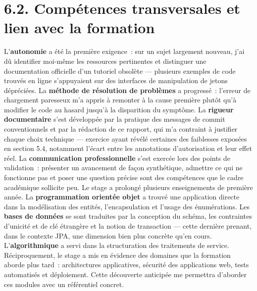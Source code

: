 \documentclass[12pt,a4paper]{report}
\begin{document}
\section*{6.2. Compétences transversales et lien avec la formation}
L'\textbf{autonomie} a été la première exigence~: sur un sujet largement nouveau, j'ai dû identifier moi-même les ressources pertinentes et distinguer une documentation officielle d'un tutoriel obsolète — plusieurs exemples de code trouvés en ligne s'appuyaient sur des interfaces de manipulation de jetons dépréciées. La \textbf{méthode de résolution de problèmes} a progressé~: l'erreur de chargement paresseux m'a appris à remonter à la cause première plutôt qu'à modifier le code au hasard jusqu'à la disparition du symptôme. La \textbf{rigueur documentaire} s'est développée par la pratique des messages de commit conventionnels et par la rédaction de ce rapport, qui m'a contraint à justifier chaque choix technique — exercice ayant révélé certaines des faiblesses exposées en section 5.4, notamment l'écart entre les annotations d'autorisation et leur effet réel. La \textbf{communication professionnelle} s'est exercée lors des points de validation~: présenter un avancement de façon synthétique, admettre ce qui ne fonctionne pas et poser une question précise sont des compétences que le cadre académique sollicite peu.
Le stage a prolongé plusieurs enseignements de première année. La \textbf{programmation orientée objet} a trouvé une application directe dans la modélisation des entités, l'encapsulation et l'usage des énumérations. Les \textbf{bases de données} se sont traduites par la conception du schéma, les contraintes d'unicité et de clé étrangère et la notion de transaction — cette dernière prenant, dans le contexte JPA, une dimension bien plus concrète qu'en cours. L'\textbf{algorithmique} a servi dans la structuration des traitements de service. Réciproquement, le stage a mis en évidence des domaines que la formation aborde plus tard~: architectures applicatives, sécurité des applications web, tests automatisés et déploiement. Cette découverte anticipée me permettra d'aborder ces modules avec un référentiel concret.
\end{document}
